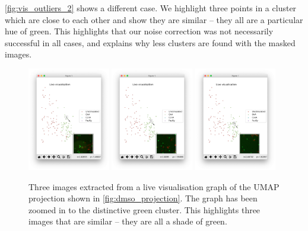 \autoref{fig:vis_outliers_2} shows a different case. We highlight three points in a cluster which are close to each other and show they are similar – they all are a particular hue of green. This highlights that our noise correction was not necessarily successful in all cases, and explains why less clusters are found with the masked images.

\begin{figure}[h]
    \centering
    \includegraphics[width=0.32\textwidth]{dissertation/figures/evaluation/green_cluster_1.png}
    \includegraphics[width=0.32\textwidth]{dissertation/figures/evaluation/green_cluster_2.png}
    \includegraphics[width=0.32\textwidth]{dissertation/figures/evaluation/green_cluster_3.png}
    \caption{Three images extracted from a live visualisation graph of the UMAP projection shown in \autoref{fig:dmso_projection}. The graph has been zoomed in to the distinctive green cluster. This highlights three images that are similar – they are all a shade of green.}
    \label{fig:vis_outliers_2}
\end{figure}

